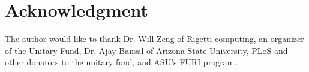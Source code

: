 \documentclass[journal]{IEEEtran}
\begin{document}



\section*{Acknowledgment}

The author would like to thank Dr. Will Zeng of Rigetti computing, an organizer of the Unitary Fund, Dr. Ajay Bansal of Arizona State University, PLoS and other donators to the unitary fund, and ASU's FURI program.

\ifCLASSOPTIONcaptionsoff
  \newpage
\fi




\end{document}

